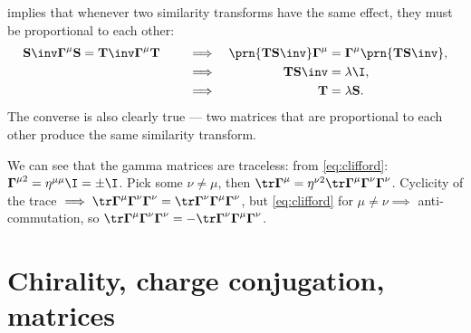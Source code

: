 \documentclass[11pt]{article}
\newcommand{\Gammab}{\boldsymbol{\Gamma}}
\renewcommand{\S}{\mathbf{S}}
\newcommand{\T}{\mathbf{T}}
\begin{document}
 implies that whenever two similarity transforms have the same effect, they must be proportional to each other:
%
\begin{equation}\label{eq:simsim}
  \S\inv \Gammab^\mu \S = \T\inv \Gammab^\mu \T
  \qquad
  \begin{aligned}[t]
     &\implies &
     \prn{\T \S\inv} \Gammab^\mu &= \Gammab^\mu \prn{\T \S\inv}, \\
     &\implies &
     \T \S\inv &= \lambda \I, \\
     &\implies &
     \T &= \lambda \S.
  \end{aligned}
\end{equation}
%
The converse is also clearly true --- two matrices that are proportional to each other produce the same similarity transform.

We can see that the gamma matrices are traceless: from \cref{eq:clifford}: \( \Gammab^{\mu2} = \eta^{\mu\mu} \I = \pm \I \).
Pick some $\nu \neq \mu$, then \( \tr \Gammab^\mu = \eta^{\nu2} \tr \Gammab^\mu \Gammab^\nu \Gammab^\nu \).
Cyclicity of the trace \( \implies \tr \Gammab^\mu \Gammab^\nu \Gammab^\nu = \tr \Gammab^\nu \Gammab^\mu \Gammab^\nu \), but \cref{eq:clifford} for $\mu \neq \nu \implies$ anti-commutation, so \( \tr \Gammab^\mu \Gammab^\nu \Gammab^\nu = - \tr \Gammab^\nu \Gammab^\mu \Gammab^\nu \).



\section{Chirality, charge conjugation, \etc matrices}\label{sec:ccmats}
\end{document}
